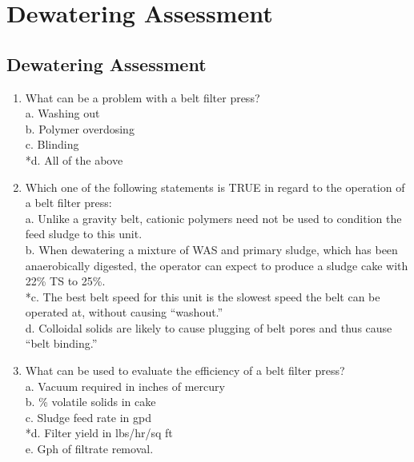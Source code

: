 
\chapter{Dewatering Assessment}

\section*{Dewatering Assessment}
\begin{enumerate}


\item  What can be a problem with a belt filter press? \\

a. Washing out \\
b. Polymer overdosing \\
c. Blinding \\
*d. All of the above \\

\item  Which one of the following statements is TRUE in regard to the operation of a belt filter press: \\

a. Unlike a gravity belt, cationic polymers need not be used to condition the feed sludge to this unit. \\
b. When dewatering a mixture of WAS and primary sludge, which has been anaerobically digested, the operator can expect to produce a sludge cake with 22\% TS to 25\%. \\
*c. The best belt speed for this unit is the slowest speed the belt can be operated at, without causing “washout.” \\
d. Colloidal solids are likely to cause plugging of belt pores and thus cause “belt binding.” \\

\item  What can be used to evaluate the efficiency of a belt filter press? \\

a. Vacuum required in inches of mercury \\
b. \% volatile solids in cake \\
c. Sludge feed rate in gpd \\
*d. Filter yield in lbs/hr/sq ft \\
e. Gph of filtrate removal. \\


\end{enumerate}
